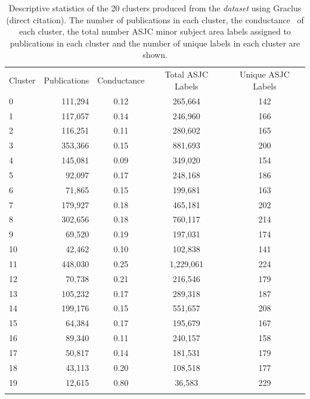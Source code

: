 \begin{table}[ht]
\caption{Descriptive statistics of the 20 clusters produced from the \emph{dataset} using Graclus (direct citation).  The number of publications in each cluster, the conductance~\cite{shun_parallel_2016} of each cluster, the total number ASJC minor subject area labels assigned to publications in each cluster and the number of 
unique labels in each cluster are shown.}
\label{tab:graclus}       
\begin{tabular}{lrccc}
\hline\noalign{\smallskip}
Cluster & Publications & Conductance & Total ASJC Labels & Unique ASJC Labels\\
\noalign{\smallskip}\hline\noalign{\smallskip}
0 & 111,294 & 0.12 & 265,664 & 142 \\ 
1 & 117,057 & 0.14 & 246,960 & 166 \\ 
2 & 116,251 & 0.11 & 280,602 & 165 \\ 
3 & 353,366 & 0.15 & 881,693 & 200 \\ 
4 & 145,081 & 0.09 & 349,020 & 154 \\ 
5 & 92,097 & 0.17 & 248,168 & 186 \\ 
6 & 71,865 & 0.15 & 199,681 & 163 \\ 
7 & 179,927 & 0.18 & 465,181 & 202 \\ 
8 & 302,656 & 0.18 & 760,117 & 214 \\ 
9 & 69,520 & 0.19 & 197,031 & 174 \\ 
10 & 42,462 & 0.10 & 102,838 & 141 \\ 
11 & 448,030 & 0.25 & 1,229,061 & 224 \\ 
12 & 70,738 & 0.21 & 216,546 & 179 \\ 
13 & 105,232 & 0.17 & 289,318 & 187 \\ 
14 & 199,176 & 0.15 & 551,657 & 208 \\ 
15 & 64,384 & 0.17 & 195,679 & 167 \\ 
16 & 89,340 & 0.11 & 240,157 & 158 \\ 
17 & 50,817 & 0.14 & 181,531 & 179 \\ 
18 & 43,113 & 0.20 & 108,518 & 177 \\ 
19 & 12,615 & 0.80 & 36,583 & 229 \\ 
\noalign{\smallskip}\hline
\end{tabular}
\end{table}
\newpage

